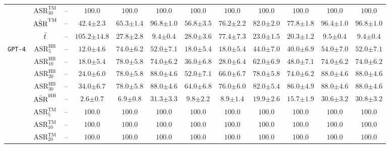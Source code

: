 \begin{table*}[t]
{\begin{tabular}{c|c||c|c|c||c|c|c|c||c|c|c}
& $\text{ASR}^{\text{TM}}_{30}$ & -- & $\mathbf{100.0}$ & $\mathbf{100.0}$ & $\mathbf{100.0}$ & $\mathbf{100.0}$ & $\mathbf{100.0}$ & $\mathbf{100.0}$ & $\mathbf{100.0}$ & $\mathbf{100.0}$ & $\mathbf{100.0}$ \\
& $\Bar{\text{ASR}}^{\text{TM}}$ & -- & $42.4{\pm 2.3}$ & $65.3{\pm 1.4}$ & $\mathbf{96.8{\pm 1.0}}$ & $56.8{\pm 3.5}$ & $76.2{\pm 2.2}$ & $82.0{\pm 2.0}$ & $77.8{\pm 1.8}$ & $96.4{\pm 1.0}$ & $\mathbf{96.8{\pm 1.0}}$ \\
\cline{2-12}
& $\Bar{t}$ & -- & $105.2{\pm 14.8}$ & $27.8{\pm 2.8}$ & $9.4{\pm 0.4}$ & $28.0{\pm 3.6}$ & $77.4{\pm 7.3}$ & $23.0{\pm 1.5}$ & $20.3{\pm 1.2}$ & $9.5{\pm 0.4}$ & $9.4{\pm 0.4}$ \\
\hline
\hline
\multirow{11}{*}{\texttt{GPT-4}} 
& $\text{ASR}^{\text{HB}}_{5}$ & -- & $12.0{\pm 4.6}$ & $\mathbf{74.0{\pm 6.2}}$ & $52.0{\pm 7.1}$ & $18.0{\pm 5.4}$ & $18.0{\pm 5.4}$ & $44.0{\pm 7.0}$ & $40.0{\pm 6.9}$ & $54.0{\pm 7.0}$ & $52.0{\pm 7.1}$ \\
& $\text{ASR}^{\text{HB}}_{10}$ & -- & $18.0{\pm 5.4}$ & $\mathbf{78.0{\pm 5.8}}$ & $74.0{\pm 6.2}$ & $36.0{\pm 6.8}$ & $28.0{\pm 6.4}$ & $62.0{\pm 6.9}$ & $48.0{\pm 7.1}$ & $74.0{\pm 6.2}$ & $74.0{\pm 6.2}$ \\
& $\text{ASR}^{\text{HB}}_{20}$ & -- & $24.0{\pm 6.0}$ & $78.0{\pm 5.8}$ & $\mathbf{88.0{\pm 4.6}}$ & $52.0{\pm 7.1}$ & $66.0{\pm 6.7}$ & $78.0{\pm 5.8}$ & $74.0{\pm 6.2}$ & $\mathbf{88.0{\pm 4.6}}$ & $\mathbf{88.0{\pm 4.6}}$ \\
& $\text{ASR}^{\text{HB}}_{30}$ & -- & $34.0{\pm 6.7}$ & $78.0{\pm 5.8}$ & $\mathbf{88.0{\pm 4.6}}$ & $64.0{\pm 6.8}$ & $76.0{\pm 6.0}$ & $82.0{\pm 5.4}$ & $86.0{\pm 4.9}$ & $\mathbf{88.0{\pm 4.6}}$ & $\mathbf{88.0{\pm 4.6}}$ \\
& $\Bar{\text{ASR}}^{\text{HB}}$ & -- & $2.6{\pm 0.7}$ & $6.9{\pm 0.8}$ & $\mathbf{31.3{\pm 3.3}}$ & $9.8{\pm 2.2}$ & $8.9{\pm 1.4}$ & $19.9{\pm 2.6}$ & $15.7{\pm 1.9}$ & $30.6{\pm 3.2}$ & $30.8{\pm 3.2}$ \\
\cline{2-12}
& $\text{ASR}^{\text{TM}}_{5}$ & -- & $\mathbf{100.0}$ & $\mathbf{100.0}$ & $\mathbf{100.0}$ & $\mathbf{100.0}$ & $\mathbf{100.0}$ & $\mathbf{100.0}$ & $\mathbf{100.0}$ & $\mathbf{100.0}$ & $\mathbf{100.0}$ \\
& $\text{ASR}^{\text{TM}}_{10}$ & -- & $\mathbf{100.0}$ & $\mathbf{100.0}$ & $\mathbf{100.0}$ & $\mathbf{100.0}$ & $\mathbf{100.0}$ & $\mathbf{100.0}$ & $\mathbf{100.0}$ & $\mathbf{100.0}$ & $\mathbf{100.0}$ \\
& $\text{ASR}^{\text{TM}}_{20}$ & -- & $\mathbf{100.0}$ & $\mathbf{100.0}$ & $\mathbf{100.0}$ & $\mathbf{100.0}$ & $\mathbf{100.0}$ & $\mathbf{100.0}$ & $\mathbf{100.0}$ & $\mathbf{100.0}$ & $\mathbf{100.0}$ \\

\end{tabular}}
\end{table*}
